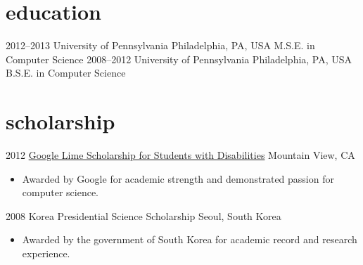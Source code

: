 \documentclass[]{patyoon-cv}
\begin{document}
\section{education}

\begin{entrylist}
\entry
{2012–2013}
{University of Pennsylvania}
{Philadelphia, PA, USA}
{M.S.E. in Computer Science}
\entry
{2008–2012}
{University of Pennsylvania}
{Philadelphia, PA, USA}
{B.S.E. in Computer Science}
\end{entrylist}

\section{scholarship}

\begin{entrylist}
\entry
{2012} {\href{http://www.limeconnect.com/opportunities/page/google-lime-scholarship-program}
{Google Lime Scholarship for Students with Disabilities}}
{Mountain View, CA}
{\begin{itemize}
\item Awarded by Google for academic strength and demonstrated passion for computer science.
\end{itemize}
}
\entry
{2008}
{Korea Presidential Science Scholarship}
{Seoul, South Korea}
{\begin{itemize}
\item Awarded by the government of South Korea for academic record and research experience.
\end{itemize}
}
\end{entrylist}
\end{document}
